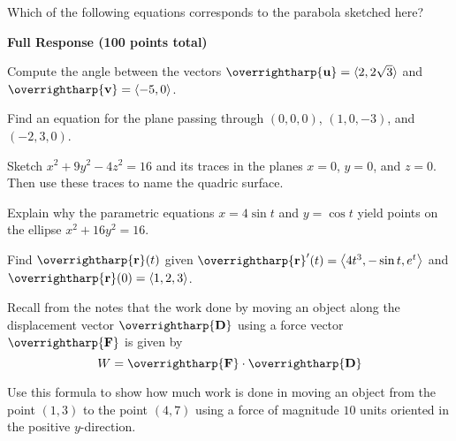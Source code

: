 \documentclass[12pt]{exam}
\newcommand{\harpvec}[1]{\overrightharp{\ensuremath{\mathbf{#1}}}}
\newcommand{\vect}[1]{\harpvec{#1}}
\newcommand{\<}{\langle}
\renewcommand{\>}{\rangle}
\begin{document}
\begin{questions}
\question[15]
Which of the following equations corresponds to the parabola sketched here?

\begin{center}
\end{center}

\end{questions}





\newpage


\begin{center}
  \textbf{Full Response (100 points total)}
\end{center}

\begin{questions}

\setcounter{question}{0}

\question[5]
  Compute the angle between the vectors
  $\vect{u}=\<2,2\sqrt{3}\>$ and $\vect{v}=\<-5,0\>$.

\newpage

\question[5]
  Find an equation for the plane passing through $(0,0,0)$,
  $(1,0,-3)$, and $(-2,3,0)$.

\newpage

\question[5]
  Sketch $x^2+9y^2-4z^2=16$ and its traces in the planes $x=0$, $y=0$,
  and $z=0$.
  Then use these traces to name the quadric surface.

\newpage

\question[5]
  Explain why the parametric equations $x=4\sin t$ and $y=\cos t$
  yield points on the ellipse $x^2+16y^2=16$.

\newpage

\question[5]
  Find $\vect{r}(t)$ given
  $\vect{r}'(t) = \left\<4t^3, -\sin t, e^t\right\>$
  and $\vect{r}(0) = \<1, 2, 3\>$.

\newpage

\question[5]
  Recall from the notes that the work done by moving an object
  along the displacement vector $\vect{D}$ using a force vector
  $\vect{F}$ is given by
  \[
    W = \vect{F}\cdot\vect{D}
  \]

  Use this formula to show how much work is done in moving an
  object from the point $(1,3)$ to the point $(4,7)$ using
  a force of magnitude $10$ units oriented
  in the positive $y$-direction.
\end{questions}
\end{document}
